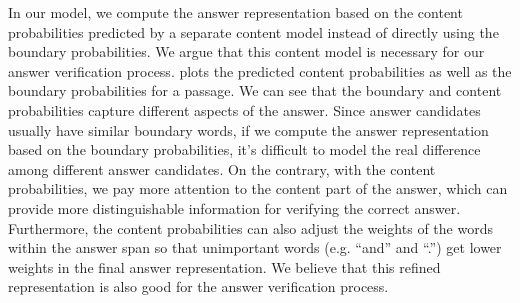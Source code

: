 
In our model, we compute the answer representation based on the content probabilities predicted by a separate content model instead of directly using the boundary probabilities. 
We argue that this content model is necessary for our answer verification process.   plots the predicted content probabilities as well as the boundary probabilities for a passage. We can see that the boundary and content probabilities capture different aspects of the answer. 
Since answer candidates usually have similar boundary words, if we compute the answer representation based on the boundary probabilities, it's difficult to model the real difference among different answer candidates.
On the contrary, with the content probabilities, we pay more attention to the content part of the answer, which can provide more distinguishable information for verifying the correct answer. Furthermore, the content probabilities can also adjust the weights of the words within the answer span so that unimportant words (e.g. ``and'' and ``.'') get lower weights in the final answer representation. We believe that this refined representation is also good for the answer verification process.


